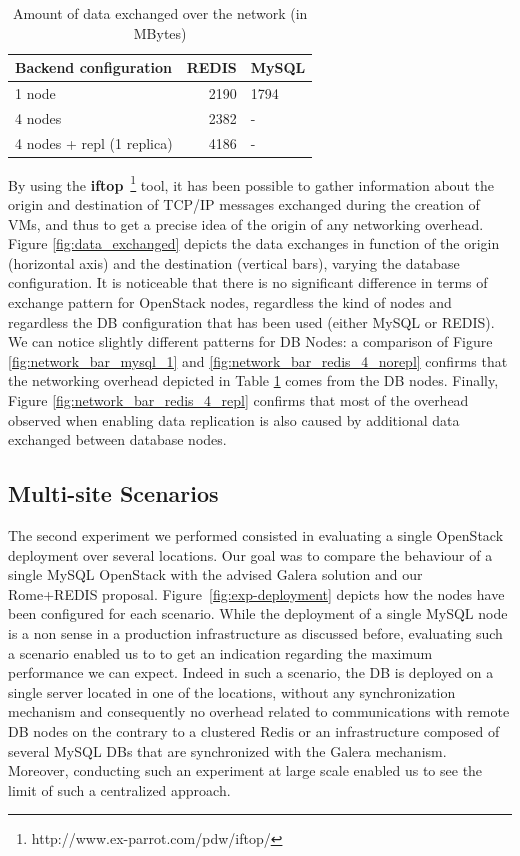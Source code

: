 \begin{table}[htb]
\caption{\label{tab:data_exchanged_comparison} Amount of data exchanged over the
  network (in MBytes)} \centering
\begin{tabular}{lrl}
Backend configuration & REDIS & MySQL\\
\hline
1 node & 2190 & 1794 \\
4 nodes & 2382 & -\\
4 nodes + repl (1 replica) & 4186 & -\\
\end{tabular}
\end{table}

By using the \textbf{iftop}~\footnote{http://www.ex-parrot.com/pdw/iftop/} tool,
it has been possible to gather information about the origin and destination of
TCP/IP messages exchanged during the creation of VMs, and thus to get a precise
idea of the origin of any networking overhead. Figure \ref{fig:data_exchanged}
depicts the data exchanges in function of the origin (horizontal axis) and the
destination (vertical bars), varying the database configuration. It is
noticeable that there is no significant difference in terms of exchange pattern
for OpenStack nodes, regardless the kind of nodes and regardless the DB
configuration that has been used (either MySQL or REDIS). We can notice slightly
different patterns for DB Nodes: a comparison of Figure
\ref{fig:network_bar_mysql_1} and \ref{fig:network_bar_redis_4_norepl} confirms
that the networking overhead depicted in Table
\ref{tab:data_exchanged_comparison} comes from the DB nodes. Finally,
Figure \ref{fig:network_bar_redis_4_repl} confirms that most of
the overhead observed when enabling data replication is also caused by additional
data exchanged between database nodes.

\subsection{Multi-site Scenarios\label{sec:multisite_exps}}

The second experiment we performed consisted in evaluating a single OpenStack deployment over several locations. Our goal was to compare the behaviour of a
single MySQL OpenStack with the advised Galera solution and our Rome+REDIS proposal. Figure~\ref{fig:exp-deployment} depicts how the nodes have been
configured for each scenario. While the deployment of a single MySQL node is a non sense in a production infrastructure as discussed before,
evaluating such a scenario enabled us to to get an indication regarding the maximum performance we can expect. Indeed in such a scenario, the DB is
deployed on a single server located in one of the locations, without any synchronization mechanism and consequently no overhead related to
communications with remote DB nodes on the contrary to a clustered Redis or an infrastructure composed of several MySQL DBs that are synchronized with
the Galera mechanism. Moreover, conducting such an experiment at large scale enabled us to see the limit of such a centralized approach.

